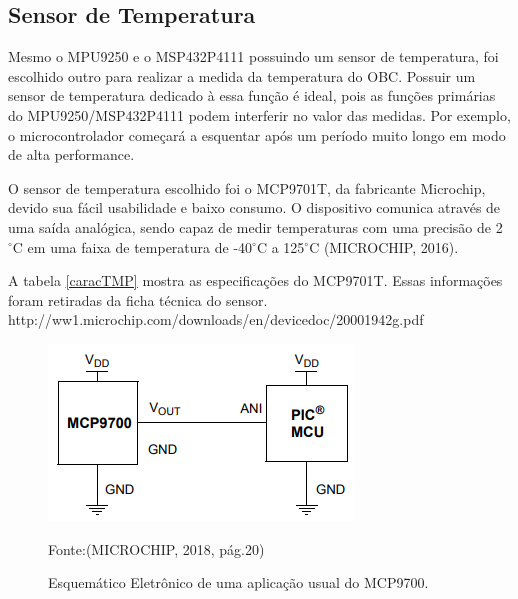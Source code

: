 \subsection{Sensor de Temperatura}

Mesmo o MPU9250 e o MSP432P4111 possuindo um sensor de temperatura, foi escolhido outro para realizar a medida da temperatura do OBC. Possuir um sensor de temperatura dedicado à essa função é ideal, pois as funções primárias do MPU9250/MSP432P4111 podem interferir no valor das medidas. Por exemplo, o microcontrolador começará a esquentar após um período muito longo em modo de alta performance. 

O sensor de temperatura escolhido foi o MCP9701T, da fabricante Microchip, devido sua fácil usabilidade e baixo consumo. O dispositivo comunica através de uma saída analógica, sendo capaz de medir temperaturas com uma precisão de 2 $^{\circ}$C em uma faixa de temperatura de -40$^{\circ}$C a 125$^{\circ}$C (MICROCHIP, 2016).

A tabela \ref{caracTMP} mostra as especificações do MCP9701T. Essas informações foram retiradas da ficha técnica do sensor.
http://ww1.microchip.com/downloads/en/devicedoc/20001942g.pdf
\begin{figure}[h]
	\centering
	\caption{Esquemático Eletrônico de uma aplicação usual do MCP9700.}
	
	\includegraphics[keepaspectratio=true,scale=0.6]{figuras/MCP9700.PNG}
	
	Fonte:(MICROCHIP, 2018, pág.20)\linebreak
	\label{MCP9700}
\end{figure}

